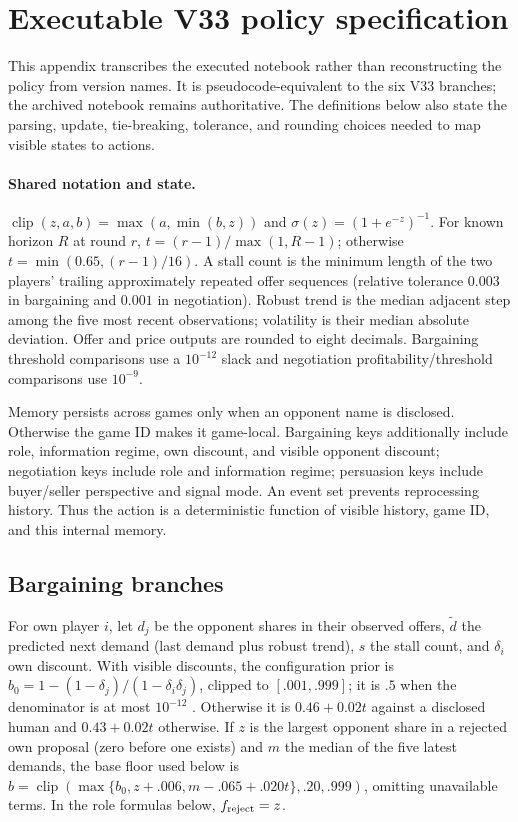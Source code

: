 \section{Executable V33 policy specification}
\label{app:policy}

This appendix transcribes the executed notebook rather than reconstructing the
policy from version names. It is pseudocode-equivalent to the six V33 branches;
the archived notebook remains authoritative. The definitions below also state
the parsing, update, tie-breaking, tolerance, and rounding choices needed to
map visible states to actions.

\paragraph{Shared notation and state.}
$\operatorname{clip}(z,a,b)=\max(a,\min(b,z))$ and
$\sigma(z)=(1+e^{-z})^{-1}$. For known horizon $R$ at round $r$,
$t=(r-1)/\max(1,R-1)$; otherwise $t=\min(0.65,(r-1)/16)$. A stall count is the
minimum length of the two players' trailing approximately repeated offer
sequences (relative tolerance $0.003$ in bargaining and $0.001$ in
negotiation). Robust trend is the median adjacent step among the five most
recent observations; volatility is their median absolute deviation.
Offer and price outputs are rounded to eight decimals. Bargaining threshold
comparisons use a $10^{-12}$ slack and negotiation profitability/threshold
comparisons use $10^{-9}$.

Memory persists across games only when an opponent name is disclosed. Otherwise
the game ID makes it game-local. Bargaining keys additionally include role,
information regime, own discount, and visible opponent discount; negotiation
keys include role and information regime; persuasion keys include buyer/seller
perspective and signal mode. An event set prevents reprocessing history. Thus
the action is a deterministic function of visible history, game ID, and this
internal memory.

\subsection{Bargaining branches}

For own player $i$, let $d_j$ be the opponent shares in their observed offers,
$\tilde d$ the predicted next demand (last demand plus robust trend), $s$ the
stall count, and $\delta_i$ own discount. With visible discounts, the
configuration prior is
$b_0=1-(1-\delta_j)/(1-\delta_i\delta_j)$, clipped to $[.001,.999]$; it is
$.5$ when the denominator is at most $10^{-12}$
\citep{rubinstein1982perfect}. Otherwise it is $0.46+0.02t$ against a disclosed human and
$0.43+0.02t$ otherwise. If $z$ is the largest opponent share in a rejected own
proposal (zero before one exists) and $m$ the median of the five latest demands,
the base floor used
below is $b=\operatorname{clip}(\max\{b_0,z+.006,m-.065+.020t\},.20,.999)$,
omitting unavailable terms. In the role formulas below,
$f_{\rm reject}=z$.


